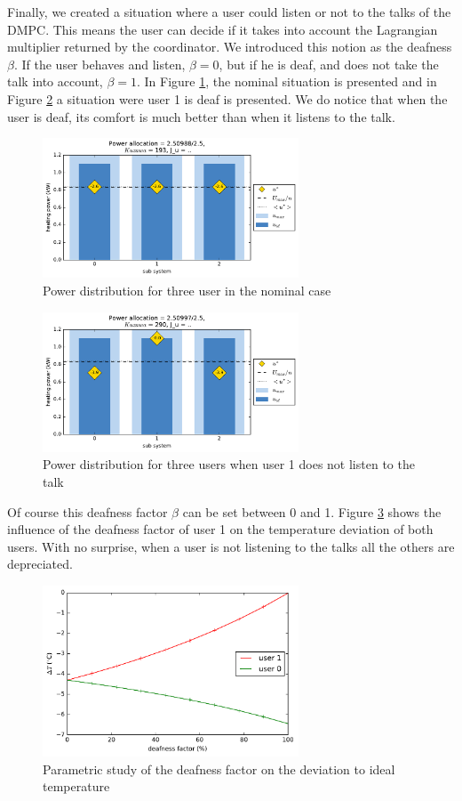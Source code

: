 \documentclass[conference]{IEEEtran}
\begin{document}
Finally, we created a situation where a user could listen or not to the talks of the DMPC. This means the user can decide if it takes into account the Lagrangian multiplier returned by the coordinator. We introduced this notion as the deafness $\beta$. If the user behaves and listen, $\beta = 0$, but if he is deaf,  and does not take the talk into account,  $\beta =1$. In Figure \ref{SRecal_i}, the nominal situation is presented and in Figure \ref{SRecal_} a situation were user 1 is deaf is presented. We do notice that when the user is deaf, its comfort is much better than when it listens to the talk. 
\begin{figure}[H]
\centering
\includegraphics[width=3in]{StatRecal_init.pdf}
\caption{Power distribution for three user in the nominal case}
\label{SRecal_i}
\end{figure}

\begin{figure}[H]
\centering
\includegraphics[width=3in]{StatRecal.pdf}
\caption{Power distribution for three users when user 1 does not listen to the talk}
\label{SRecal_}
\end{figure}
Of course this deafness factor $\beta$ can be set between 0 and 1. Figure \ref{SRecal_mult} shows the influence of the deafness factor of user 1 on the temperature deviation of both users. With no surprise, when a user is not listening to the talks all the others are depreciated.
\begin{figure}[H]
\centering
\includegraphics[width=3in]{param_mult.pdf}
\caption{Parametric study of the deafness factor on the deviation to ideal temperature}
\label{SRecal_mult}
\end{figure}
\end{document}
